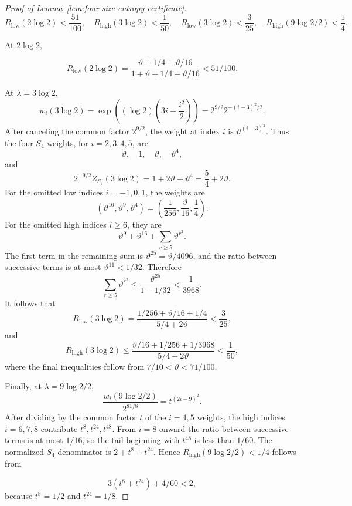 \documentclass[a4paper,10pt,reqno]{amsart}
\numberwithin{equation}{section}
\theoremstyle{plain}
\theoremstyle{remark}
\begin{document}
\begin{proof}[Proof of Lemma~\ref{lem:four-size-entropy-certificate}]
\begin{equation}
 R_{\mathrm{low}}(2{\log 2})<\frac{51}{100},\quad
 R_{\mathrm{high}}(3{\log 2})<\frac1{50},\quad
 R_{\mathrm{low}}(3{\log 2})<\frac3{25},\quad
 R_{\mathrm{high}}(9{\log 2}/2)<\frac14.                 \label{eq:E-ratio-bounds}
\end{equation}

At \(2{\log 2}\),

\[
 R_{\mathrm{low}}(2{\log 2})
 =\frac{\vartheta+1/4+\vartheta/16}
        {1+\vartheta+1/4+\vartheta/16}<51/100.
\]

At \(\lambda=3\log 2\),
\[
 w_i(3\log 2)
 =\exp\!\left((\log 2)\left(3i-\frac{i^2}{2}\right)\right)
 =2^{9/2}2^{-(i-3)^2/2}.
\]
After canceling the common factor \(2^{9/2}\),
the weight at index \(i\) is \(\vartheta^{(i-3)^2}\). Thus the four
\(S_4\)-weights, for \(i=2,3,4,5\), are
\[
 \vartheta,\quad 1,\quad \vartheta,\quad \vartheta^4,
\]
and
\[
 2^{-9/2}Z_{S_4}(3\log 2)
 =1+2\vartheta+\vartheta^4=\frac54+2\vartheta.
\]
For the omitted low indices \(i=-1,0,1\), the weights are
\[
 (\vartheta^{16},\vartheta^9,\vartheta^4)
 =\left(\frac1{256},\frac{\vartheta}{16},\frac14\right).
\]
For the omitted high indices \(i\ge6\), they are
\[
 \vartheta^9+\vartheta^{16}+\sum_{r\ge5}\vartheta^{r^2}.
\]
The first term in the remaining sum is
\(\vartheta^{25}=\vartheta/4096\), and the ratio between successive terms is
at most \(\vartheta^{11}<1/32\). Therefore
\[
 \sum_{r\ge5}\vartheta^{r^2}
 \le\frac{\vartheta^{25}}{1-1/32}<\frac1{3968}.
\]
It follows that
\[
 R_{\mathrm{low}}(3\log 2)
 =\frac{1/256+\vartheta/16+1/4}{5/4+2\vartheta}<\frac3{25},
\]
and
\[
 R_{\mathrm{high}}(3\log 2)
 \le\frac{\vartheta/16+1/256+1/3968}{5/4+2\vartheta}<\frac1{50},
\]
where the final inequalities follow from
\(7/10<\vartheta<71/100\).

Finally, at $\lambda=9\log 2/2$,
\[
  \frac{w_i(9\log 2/2)}{2^{81/8}}=t^{(2i-9)^2}.
\]
After dividing by the common factor $t$ of the $i=4,5$ weights, the high
indices $i=6,7,8$ contribute $t^8,t^{24},t^{48}$.
From \(i=8\) onward the ratio between successive terms is at most
\(1/16\), so the tail beginning with \(t^{48}\) is less than \(1/60\).
The normalized \(S_4\) denominator is \(2+t^8+t^{24}\). Hence
\(R_{\mathrm{high}}(9\log 2/2)<1/4\) follows from

\begin{equation}
 3(t^8+t^{24})+4/60<2,                                  \label{eq:E-high-ratio}
\end{equation}
because \(t^8=1/2\) and \(t^{24}=1/8\).


\end{proof}
\end{document}
